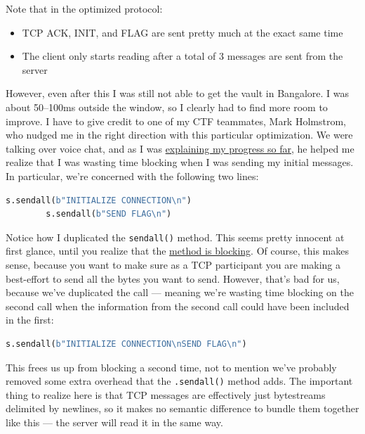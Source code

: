 \documentclass[11pt]{article}
\begin{document}
    \noindent Note that in the optimized protocol:
    \begin{itemize}
        \item TCP ACK, INIT, and FLAG are sent pretty much at the exact same time
        \item The client only starts reading after a total of 3 messages are sent from the server
    \end{itemize}

    However, even after this I was still not able to get the vault in Bangalore. I was about 50--100ms outside the window, so I clearly had to find more room to improve. I have to give credit to one of my CTF teammates, Mark Holmstrom, who nudged me in the right direction with this particular optimization. We were talking over voice chat, and as I was \href{https://en.wikipedia.org/wiki/Rubber_duck_debugging}{explaining my progress so far}, he helped me realize that I was wasting time blocking when I was sending my initial messages. In particular, we're concerned with the following two lines:

    \begin{lstlisting}[gobble=8,label={lst:second-efficiency-1},language=Python]
        s.sendall(b"INITIALIZE CONNECTION\n")
        s.sendall(b"SEND FLAG\n")
    \end{lstlisting}

    Notice how I duplicated the \verb`sendall()` method. This seems pretty innocent at first glance, until you realize that the \href{https://docs.python.org/3/library/socket.html#socket.socket.sendall}{method is blocking}. Of course, this makes sense, because you want to make sure as a TCP participant you are making a best-effort to send all the bytes you want to send. However, that's bad for us, because we've duplicated the call --- meaning we're wasting time blocking on the second call when the information from the second call could have been included in the first:

    \begin{lstlisting}[gobble=8,label={lst:second-efficiency-2},language=Python]
        s.sendall(b"INITIALIZE CONNECTION\nSEND FLAG\n")
    \end{lstlisting}

    This frees us up from blocking a second time, not to mention we've probably removed some extra overhead that the \verb`.sendall()` method adds. The important thing to realize here is that TCP messages are effectively just bytestreams delimited by newlines, so it makes no semantic difference to bundle them together like this --- the server will read it in the same way.
\end{document}
